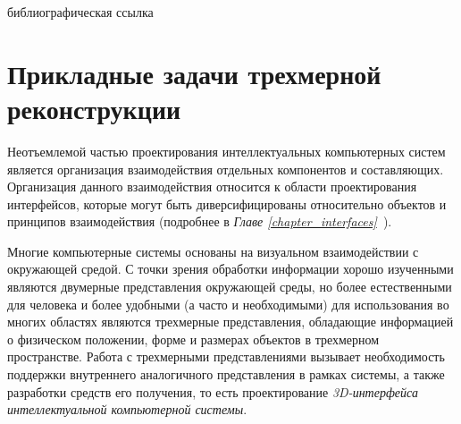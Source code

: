 \begin{SCn}
    \bigskip

    \begin{scnrelfromlist}{библиографическая ссылка}
    \end{scnrelfromlist}

\end{SCn}

\section{Прикладные задачи трехмерной реконструкции}
\label{sec_3d_models_problems}

Неотъемлемой частью проектирования интеллектуальных компьютерных систем является организация взаимодействия отдельных компонентов и составляющих. Организация данного взаимодействия относится к области проектирования интерфейсов, которые могут быть диверсифицированы относительно объектов и принципов взаимодействия (подробнее в \textit{Главе \ref{chapter_interfaces}~}).

Многие компьютерные системы основаны на визуальном взаимодействии с окружающей средой. С точки зрения обработки информации хорошо изученными являются двумерные представления окружающей среды, но более естественными для человека и более удобными (а часто и необходимыми) для использования во многих областях являются трехмерные представления, обладающие информацией о физическом положении, форме и размерах объектов в трехмерном пространстве. Работа с трехмерными представлениями вызывает необходимость поддержки внутреннего аналогичного представления в рамках системы, а также разработки средств его получения, то есть проектирование \textit{3D-интерфейса} \textit{интеллектуальной компьютерной системы}.

